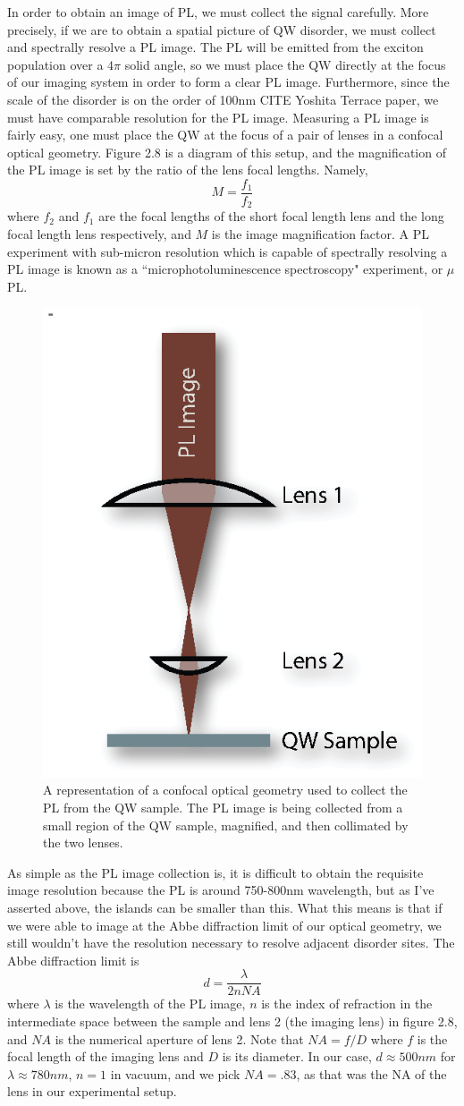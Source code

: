 \indent In order to obtain an image of PL, we must collect the signal carefully. More precisely, if we are to obtain a spatial picture of QW disorder, we must collect and spectrally resolve a PL image. The PL will be emitted from the exciton population over a $4 \pi$ solid angle, so we must place the QW directly at the focus of our imaging system in order to form a clear PL image. Furthermore, since the scale of the disorder is on the order of 100nm CITE Yoshita Terrace paper, we must have comparable resolution for the PL image. Measuring a PL image is fairly easy, one must place the QW at the focus of a pair of lenses in a confocal optical geometry. Figure 2.8 is a diagram of this setup, and the magnification of the PL image is set by the ratio of the lens focal lengths. Namely,
\begin{equation}
M = \frac{f_1}{f_2}
\end{equation}
where $f_2$ and $f_1$ are the focal lengths of the short focal length lens and the long focal length lens respectively, and $M$ is the image magnification factor. A PL experiment with sub-micron resolution which is capable of spectrally resolving a PL image is known as a ``microphotoluminescence spectroscopy" experiment, or $\mu$PL.
\begin{figure}[h!]
\label{confocal}
\centering
\includegraphics[width = .3\textwidth]{confocal.eps}
\caption{\doublespacing A representation of a confocal optical geometry used to collect the PL from the QW sample. The PL image is being collected from a small region of the QW sample, magnified, and then collimated by the two lenses.}
\end{figure}

\indent As simple as the PL image collection is, it is difficult to obtain the requisite image resolution because the PL is around 750-800nm wavelength, but as I've asserted above, the islands can be smaller than this. What this means is that if we were able to image at the Abbe diffraction limit of our optical geometry, we still wouldn't have the resolution necessary to resolve adjacent disorder sites. The Abbe diffraction limit is
\begin{equation}
d = \frac{\lambda}{2nNA}
\end{equation}
where $\lambda$ is the wavelength of the PL image, $n$ is the index of refraction in the intermediate space between the sample and lens 2 (the imaging lens) in figure 2.8, and $NA$ is the numerical aperture of lens 2. Note that $NA = f / D$ where $f$ is the focal length of the imaging lens and $D$ is its diameter. In our case, $d \approx 500 nm$ for $\lambda \approx 780 nm$, $n = 1$ in vacuum, and we pick $NA = .83$, as that was the NA of the lens in our experimental setup. 

